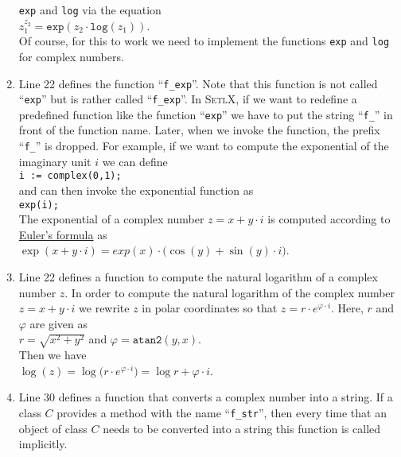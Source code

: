\begin{enumerate}
      \texttt{exp} and \texttt{log} via the equation
      \\[0.2cm]
      \hspace*{1.3cm}
      $z_1^{z_2} = \mathtt{exp}(z_2 \cdot \mathtt{log}(z_1))$.
      \\[0.2cm]
      Of course, for this to work we need to implement the functions \texttt{exp} and
      \texttt{log} for complex numbers.
\item Line 22 defines the function ``\texttt{f\_exp}''.  Note that this function is not
      called ``\texttt{exp}'' but is rather called ``\texttt{f\_exp}''.  In
      \textsc{SetlX}, if we want to redefine a predefined function like the function
      ``\texttt{exp}'' we have to put the string ``\texttt{f\_}'' in front of the function
      name.  Later, when we invoke the function, the prefix ``\texttt{f\_}'' is dropped.
      For example, if we want to compute the exponential of the imaginary unit $i$ we can
      define
      \\[0.2cm]
      \hspace*{1.3cm}
      \texttt{i := complex(0,1);}
      \\[0.2cm]
      and can then invoke the exponential function as
      \\[0.2cm]
      \hspace*{1.3cm}
      \texttt{exp(i);}
      \\[0.2cm]
      The exponential of a complex number $z = x + y \cdot i$ is computed according to
      \href{http://en.wikipedia.org/wiki/Euler%27s_formula}{Euler's formula} as
      \\[0.2cm]
      \hspace*{1.3cm}
      $\exp(x + y \cdot i) = exp(x) \cdot \bigl(\cos(y) + \sin(y) \cdot i\bigr)$.
\item Line 22 defines a function to compute the natural logarithm of a complex number $z$.
      In order to compute the natural logarithm of the complex number $z = x + y \cdot i$ we rewrite $z$
      in polar coordinates so that $z = r \cdot e^{\varphi \cdot i}$.   Here, $r$ and
      $\varphi$ are given as
      \\[0.2cm]
      \hspace*{1.3cm}
      $r = \sqrt{x^2 + y^2}$ \quad and \quad $\varphi = \mathtt{atan2}(y, x)$.
      \\[0.2cm]
      Then we have
      \\[0.2cm]
      \hspace*{1.3cm}
      $\log(z) = \log\bigl(r \cdot e^{\varphi \cdot i}\bigr) = \log r + \varphi \cdot i$.
\item Line 30 defines a function that converts a complex number into a string.  If a class
      $C$ provides a method with the name ``\texttt{f\_str}'', then every time that an object
      of class $C$ needs to be converted into a string this function is called implicitly.


\end{enumerate}
